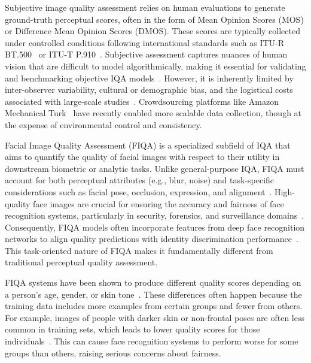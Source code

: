 Subjective image quality assessment relies on human evaluations to generate ground-truth perceptual scores, often in the form of Mean Opinion Scores (MOS) or Difference Mean Opinion Scores (DMOS). These scores are typically collected under controlled conditions following international standards such as ITU-R BT.500~\cite{itu_bt500_2023} or ITU-T P.910~\cite{itu_p910_2008}. Subjective assessment captures nuances of human vision that are difficult to model algorithmically, making it essential for validating and benchmarking objective IQA models~\cite{ponomarenko_tid2013, zaric_comparison_objective_subjective}. However, it is inherently limited by inter-observer variability, cultural or demographic bias, and the logistical costs associated with large-scale studies~\cite{ghadiyaram_crowdsourced_study_2016}. Crowdsourcing platforms like Amazon Mechanical Turk~\cite{amazon_mturk} have recently enabled more scalable data collection, though at the expense of environmental control and consistency.

Facial Image Quality Assessment (FIQA) is a specialized subfield of IQA that aims to quantify the quality of facial images with respect to their utility in downstream biometric or analytic tasks. Unlike general-purpose IQA, FIQA must account for both perceptual attributes (e.g., blur, noise) and task-specific considerations such as facial pose, occlusion, expression, and alignment~\cite{hernandez_fiqanet_2020, boutros_iqface_2021, li_biofacenet_2021}. High-quality face images are crucial for ensuring the accuracy and fairness of face recognition systems, particularly in security, forensics, and surveillance domains~\cite{xu_secureqnet_2020, luo_deepiq_2018}. Consequently, FIQA models often incorporate features from deep face recognition networks to align quality predictions with identity discrimination performance~\cite{FaceMetric2025}. This task-oriented nature of FIQA makes it fundamentally different from traditional perceptual quality assessment.

FIQA systems have been shown to produce different quality scores depending on a person's age, gender, or skin tone~\cite{jo_ifqa_2024, FaceMetric2025}. These differences often happen because the training data includes more examples from certain groups and fewer from others. For example, images of people with darker skin or non-frontal poses are often less common in training sets, which leads to lower quality scores for those individuals~\cite{kanwisher2006fusiform}. This can cause face recognition systems to perform worse for some groups than others, raising serious concerns about fairness.

